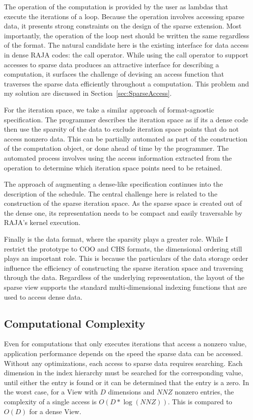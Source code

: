 The operation of the computation is provided by the user as lambdas that execute the iterations of a loop. 
Because the operation involves accessing sparse data, it presents strong constraints on the design of the sparse extension. 
Most importantly, the operation of the loop nest should be written the same regardless of the format. 
The natural candidate here is the existing interface for data access in dense RAJA codes: the call operator. 
While using the call operator to support accesses to sparse data produces an attractive interface for describing a computation, it surfaces the challenge of devising an access function that traverses the sparse data efficiently throughout a computation. This problem and my solution are discussed in Section~\ref{sec:SparseAccess}.

For the iteration space, we take a similar approach of format-agnostic specification.
The programmer describes the iteration space as if its a dense code then use the sparsity of the data to exclude iteration space points that do not access nonzero data.
This can be partially automated as part of the construction of the computation object, or done ahead of time by the programmer.
The automated process involves using the access information extracted from the operation to determine which iteration space points need to be retained.

The approach of augmenting a dense-like specification continues into the description of the schedule. 
The central challenge here is related to the construction of the sparse iteration space. 
As the sparse space is created out of the dense one, its representation needs to be compact and easily traversable by RAJA's kernel execution. 

Finally is the data format, where the sparsity plays a greater role.
While I restrict the prototype to COO and CHS formats, the dimensional ordering still plays an important role.
This is because the particulars of the data storage order influence the efficiency of constructing the sparse iteration space and traversing through the data.
Regardless of the underlying representation, the layout of the sparse view supports the standard multi-dimensional indexing functions that are used to access dense data.

\subsection{Computational Complexity}

Even for computations that only executes iterations that access a nonzero value, application performance depends on the speed the sparse data can be accessed.
Without any optimizations, each access to sparse data requires searching. 
Each dimension in the index hierarchy must be searched for the corresponding value, until either the entry is found or it can be determined that the entry is a zero.
In the worst case, for a View with $D$ dimensions and $NNZ$ nonzero entries, the complexity of a single access is $O(D * \log(NNZ))$. 
This is compared to $O(D)$ for a dense View.


